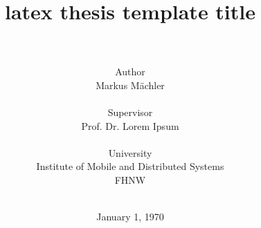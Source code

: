 \documentclass[12pt,a4paper,hidelinks]{article}
\begin{document}
	\title{
		\vspace{50mm}
		\Huge{latex thesis template title}\\
	}
	\author{
		\\\\\normalsize{Author}\\
		Markus Mächler\\~\\
		\normalsize{Supervisor}\\
		Prof. Dr. Lorem Ipsum\\~\\
		\normalsize{University}\\
		Institute of Mobile and Distributed Systems\\
		FHNW\\~\\
	}
	\date{\normalsize{January 1, 1970}}
	\maketitle	
	\thispagestyle{firstpage} %
	
	
	\tableofcontents
	
	
	
	
	
	\printglossary
	\newpage
	
	\newpage
	\listoffigures
	\newpage
	\listoftables
	\newpage
	
	
	
\end{document}
